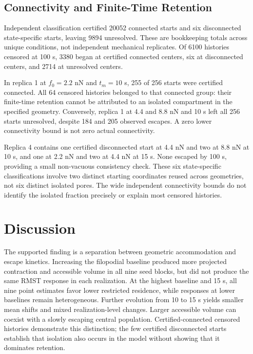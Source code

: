 \subsection{Connectivity and Finite-Time Retention}
Independent classification certified 20052 connected starts and six disconnected state-specific starts, leaving 9894 unresolved. These are bookkeeping totals across unique conditions, not independent mechanical replicates. Of 6100 histories censored at 100 s, 3380 began at certified connected centers, six at disconnected centers, and 2714 at unresolved centers.

In replica 1 at $f_0=2.2$ nN and $t_m=10$ s, 255 of 256 starts were certified connected. All 64 censored histories belonged to that connected group: their finite-time retention cannot be attributed to an isolated compartment in the specified geometry. Conversely, replica 1 at 4.4 and 8.8 nN and 10 s left all 256 starts unresolved, despite 184 and 205 observed escapes. A zero lower connectivity bound is not zero actual connectivity.

Replica 4 contains one certified disconnected start at 4.4 nN and two at 8.8 nN at 10 s, and one at 2.2 nN and two at 4.4 nN at 15 s. None escaped by 100 s, providing a small non-vacuous consistency check. These six state-specific classifications involve two distinct starting coordinates reused across geometries, not six distinct isolated pores. The wide independent connectivity bounds do not identify the isolated fraction precisely or explain most censored histories.

\section{Discussion}
The supported finding is a separation between geometric accommodation and escape kinetics. Increasing the filopodial baseline produced more projected contraction and accessible volume in all nine seed blocks, but did not produce the same RMST response in each realization. At the highest baseline and 15 s, all nine point estimates favor lower restricted residence, while responses at lower baselines remain heterogeneous. Further evolution from 10 to 15 s yields smaller mean shifts and mixed realization-level changes. Larger accessible volume can coexist with a slowly escaping central population. Certified-connected censored histories demonstrate this distinction; the few certified disconnected starts establish that isolation also occurs in the model without showing that it dominates retention.


